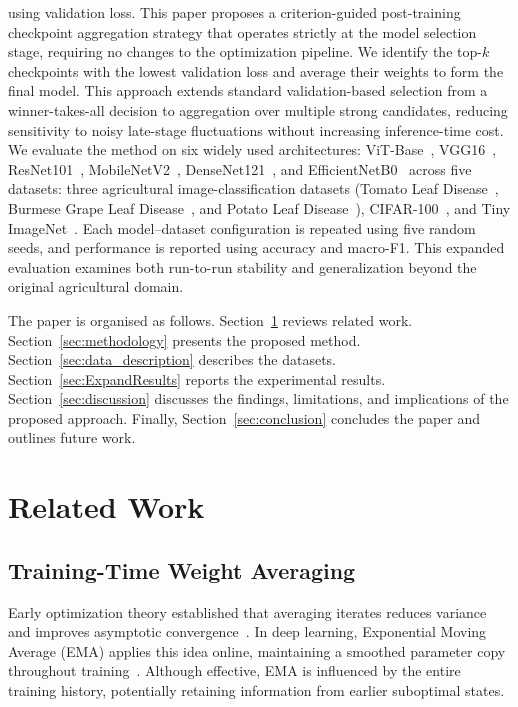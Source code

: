 \documentclass[runningheads]{llncs}
\begin{document}
using validation loss.
This paper proposes a criterion-guided post-training checkpoint aggregation strategy that operates strictly at the model selection stage, requiring no changes to the optimization pipeline. We identify the top-$k$ checkpoints with the lowest validation loss and average their weights to form the final model. This approach extends standard validation-based selection from a winner-takes-all decision to aggregation over multiple strong candidates, reducing sensitivity to noisy late-stage fluctuations without increasing inference-time cost.
We evaluate the method on six widely used architectures: ViT-Base~\cite{dosovitskiy2021imageworth16x16words}, VGG16~\cite{simonyan2015vgg}, ResNet101~\cite{he2016deep}, MobileNetV2~\cite{sandler2018mobilenetv2}, DenseNet121~\cite{huang2017densely}, and EfficientNetB0~\cite{tan2019efficientnet} across five datasets: three agricultural image-classification datasets (Tomato Leaf Disease~\cite{solapure2024tomato}, Burmese Grape Leaf Disease~\cite{rahman2025burmese}, and Potato Leaf Disease~\cite{Shabrina2023Potato}), CIFAR-100~\cite{krizhevsky2009learning}, and Tiny ImageNet~\cite{le2015tiny}. Each model--dataset configuration is repeated using five random seeds, and
performance is reported using accuracy and macro-F1. This expanded evaluation examines both run-to-run stability and
generalization beyond the original agricultural domain.

The paper is organised as follows. Section~\ref{sec:related_work} reviews related work.
Section~\ref{sec:methodology} presents the proposed method.
Section~\ref{sec:data_description} describes the datasets.
Section~\ref{sec:ExpandResults} reports the experimental results.
Section~\ref{sec:discussion} discusses the findings, limitations, and implications of the proposed approach.
Finally, Section~\ref{sec:conclusion} concludes the paper and outlines future work.

\section{Related Work}
\label{sec:related_work}

\subsection{Training-Time Weight Averaging}

Early optimization theory established that averaging iterates reduces
variance and improves asymptotic convergence~\cite{polyak1992acceleration}.
In deep learning, Exponential Moving Average (EMA) applies this idea
online, maintaining a smoothed parameter copy throughout
training~\cite{tarvainen2018meanteachersbetterrole}.
Although effective, EMA is influenced by the entire training history,
potentially retaining information from earlier suboptimal states.
\end{document}
